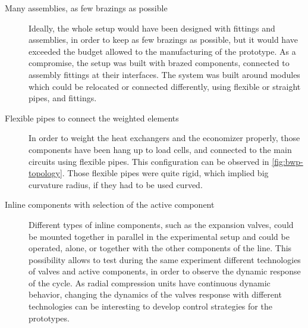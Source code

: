 \begin{description}
\item[Many assemblies, as few brazings as possible] Ideally, the whole
  setup would have been designed with fittings and assemblies, in
  order to keep as few brazings as possible, but it would have
  exceeded the budget allowed to the manufacturing of the
  prototype. As a compromise, the setup was built with brazed
  components, connected to assembly fittings at their interfaces. The
  system was built around modules which could be relocated or
  connected differently, using flexible or straight pipes, and
  fittings.
\item[Flexible pipes to connect the weighted elements] In order to
  weight the heat exchangers and the economizer properly, those
  components have been hang up to load cells, and connected to the
  main circuits using flexible pipes. This configuration can be
  observed in \cref{fig:bwp-topology}. Those flexible pipes were quite
  rigid, which implied big curvature radius, if they had to be used
  curved.
\item[Inline components with selection of the active component]
  Different types of inline components, such as the expansion valves,
  could be mounted together in parallel in the experimental setup and
  could be operated, alone, or together with the other components of
  the line. This possibility allows to test during the same experiment
  different technologies of valves and active components, in order to
  observe the dynamic response of the cycle. As radial compression units have
  continuous dynamic behavior, changing the dynamics of the valves
  response with different technologies can be interesting to develop control
  strategies for the prototypes.
\end{description}

